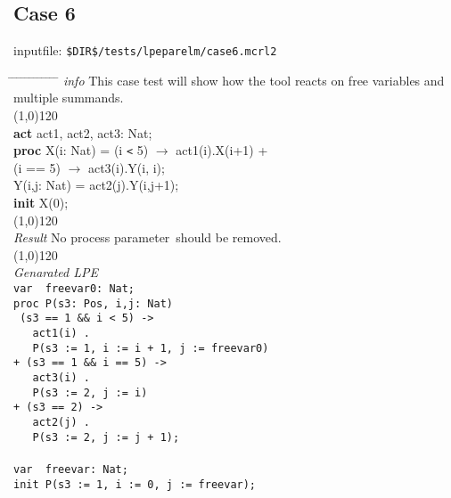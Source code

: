 \documentclass[a4paper,10pt]{article}
\theoremstyle{plain}
\theoremstyle{definition}
\newcommand{\ti}{\textit}
\newcommand{\tb}{\textbf}
\newcommand{\pp}{process parameter}
\newcommand{\tabw}{\hspace*{15.mm} \= \hspace*{20.mm} \= \hspace*{5.mm} \= \hspace*{5.mm} \= \hspace*{5.mm} \= \hspace*{5.mm}  \= \hspace*{5.mm}  \= \hspace*{5.mm}  \= \hspace*{5.mm} \= \hspace*{5.mm} \= \hspace*{5.mm}  \= \hspace*{5.mm}  \= \hspace*{5.mm}\kill}
\begin{document}
\subsection*{Case 6}
inputfile: \verb"$DIR$/tests/lpeparelm/case6.mcrl2"
\begin{tabbing}
\tabw
\ti{info} \> This case test will show how the tool reacts on free variables and multiple summands.\\
\line(1,0){120}\\
\tb{act} \> act1, act2, act3: Nat; \\
\tb{proc} \> X(i: Nat) \>  = \> (i \verb"<" 5) $\rightarrow$ act1(i).X(i+1) + \\
\> \> \>     (i == 5) $\rightarrow$ act3(i).Y(i, i); \\
\>     Y(i,j: Nat) \> = \> act2(j).Y(i,j+1); \\
\tb{init} X(0); \\
\line(1,0){120}\\
\ti{Result} \> No \pp\ should be removed.\\ 
\line(1,0){120}\\
\ti{Genarated LPE} \\
\>  \verb"var  freevar0: Nat;"\\
\>  \verb"proc P(s3: Pos, i,j: Nat)"\\
\>  \verb" (s3 == 1 && i < 5) ->"\\
\>  \verb"   act1(i) ."\\
\>  \verb"   P(s3 := 1, i := i + 1, j := freevar0)"\\
\>  \verb"+ (s3 == 1 && i == 5) ->"\\
\>  \verb"   act3(i) ."\\
\>  \verb"   P(s3 := 2, j := i)"\\
\>  \verb"+ (s3 == 2) ->"\\
\>  \verb"   act2(j) ."\\
\>  \verb"   P(s3 := 2, j := j + 1);"\\
\\
\>  \verb"var  freevar: Nat;"\\
\>  \verb"init P(s3 := 1, i := 0, j := freevar);"\\
\end{tabbing}
\end{document}
